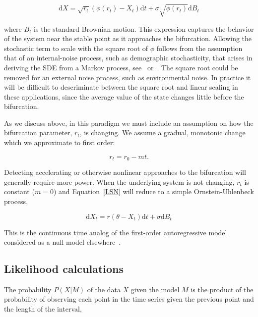 \documentclass[authoryear,review,11pt]{elsarticle}
\newcommand{\ud}{\mathrm{d}}
\begin{document}
\begin{equation}
\ud X = \sqrt{ r_t } (\phi(r_t) - X_t)\ud t + \sigma\sqrt{\phi(r_t) } \ud B_t \label{LSN}
\end{equation}

where $B_t$ is the standard Brownian motion. 
This expression captures the behavior of the system near the stable point as it approaches the bifurcation.
Allowing the stochastic term to scale with the square root of $\phi$ follows from the assumption that
of an internal-noise process, such as demographic stochasticity, that arises in deriving the SDE from
a Markov process, see~\citet{Kampen2007a} or~\citet{Black2012}. 
The square root could be removed for an external noise process, such as environmental noise.
In practice it will be difficult to descriminate between the square root and linear scaling
in these applications, since the average value of the state changes little before the bifurcation.  


As we discuss above, in this paradigm we must include an assumption on how the bifurcation parameter, $r_t$, is changing.
We assume a gradual, monotonic change which we approximate to first order:

\begin{equation}
r_t = r_0 - m t.
\label{R_t}
\end{equation}

Detecting accelerating or otherwise nonlinear approaches to the bifurcation will generally require more power.
When the underlying system is not changing, $r_t$ is constant ($m=0$) and Equation~\eqref{LSN} will reduce to a simple Ornstein-Uhlenbeck process,

\begin{equation}
\ud X_t = r (\theta - X_t) \ud t + \sigma \ud B_t \label{OU}
\end{equation}

This is the continuous time analog of the first-order autoregressive model considered as a null model elsewhere~\citep[\emph{e.g.}][]{Dakos2008, Guttal2008a}.




\subsection*{Likelihood calculations}
The probability \(P(X|M) \) of the data \(X\) given the model \(M\) is the product of the probability of observing each point in the time series given the previous point and the length of the interval,
\end{document}
